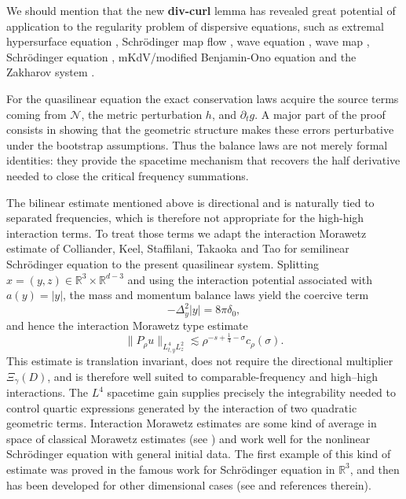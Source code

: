 \documentclass[11pt,letterpaper,reqno]{amsart}
\numberwithin{equation}{section}
\newcommand{\R}{\mathbb R}
\theoremstyle{definition}
\theoremstyle{remark}
\begin{document}
We should mention that the new \textbf{div-curl} lemma has revealed great potential of application to the regularity problem of dispersive equations, such as extremal hypersurface equation \cite{WZ1}, Schr\"{o}dinger map flow \cite{WZ2}, wave equation \cite{WZ3}, wave map \cite{LZ24}, Schr\"{o}dinger equation \cite{SZ}, mKdV/modified Benjamin-Ono equation \cite{TZ} and the Zakharov system \cite{HTZ25}.

For the quasilinear equation the exact conservation laws acquire the source terms
coming from $\mathcal N$, the metric perturbation $h$, and $\partial_tg$.  A major
part of the proof consists in showing that the geometric structure makes these
errors perturbative under the bootstrap assumptions.  Thus the balance laws are
not merely formal identities: they provide the spacetime mechanism that recovers
the half derivative needed to close the critical frequency summations.


The bilinear estimate mentioned above is directional and is naturally tied to separated
frequencies, which is therefore not appropriate for the high-high
interaction terms.  To treat those terms we adapt the interaction Morawetz estimate of Colliander, Keel, Staffilani, Takaoka and Tao \cite{CKSTT} for semilinear Schr\"{o}dinger equation to the present quasilinear system.  Splitting
$x=(y,z)\in\R^3\times\R^{d-3}$ and using the interaction potential associated with
$a(y)=|y|$, the mass and momentum balance laws yield the coercive term
\[
 -\Delta_y^2|y|=8\pi\delta_0,
\]
and hence the interaction Morawetz type estimate
\begin{equation}\label{eq:IM}
 \|P_\rho u\|_{L^4_{t,y}L^2_z}
 \lesssim
 \rho^{-s+\frac14-\sigma}c_\rho(\sigma).
\end{equation}
This estimate is translation invariant, does not require the directional
multiplier $\Xi_\gamma(D)$, and is therefore well suited to comparable-frequency
and high--high interactions.  The $L^4$ spacetime gain supplies precisely the
integrability needed to control quartic expressions generated by the interaction
of two quadratic geometric terms. Interaction Morawetz estimates are some kind of average in space of classical Morawetz estimates (see \cite{Sta, Col}) and work well for the nonlinear Schr\"{o}dinger equation with general initial data. The first example of this kind of estimate was proved in the famous work \cite{CKSTT} for Schr\"{o}dinger equation in $\mathbb{R}^3$, and then has been developed for other dimensional cases (see \cite{CGT,PV,Vis,VZ} and references therein).
\end{document}
